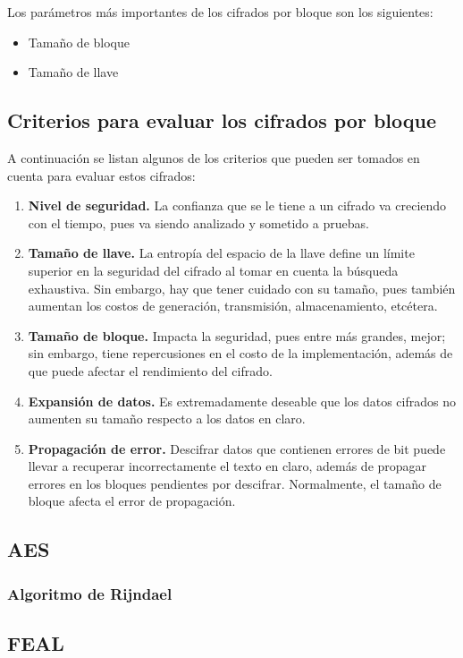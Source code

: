 Los parámetros más importantes de los cifrados por bloque son los 
siguientes:
\begin{itemize}
	\item Tamaño de bloque
	\item Tamaño de llave
\end{itemize}

\subsection{Criterios para evaluar los cifrados por bloque}

A continuación se listan algunos de los criterios que pueden ser tomados en cuenta para evaluar estos cifrados:
\begin{enumerate}
	\item \textbf{Nivel de seguridad.} La confianza que se le tiene a un 
		cifrado va creciendo con el tiempo, pues va siendo analizado y 
		sometido a pruebas.
	\item \textbf{Tamaño de llave.} La entropía del espacio de la llave 
		define un límite superior en la seguridad del cifrado al tomar en 
		cuenta la búsqueda exhaustiva. Sin embargo, hay que tener cuidado 
		con su tamaño, pues también aumentan los costos de generación, 
		transmisión, almacenamiento, etcétera.
	\item \textbf{Tamaño de bloque.} Impacta la seguridad, pues entre más 
		grandes, mejor; sin embargo, tiene repercusiones en el costo de la 
		implementación, además de que puede afectar el rendimiento del 
		cifrado.
	\item \textbf{Expansión de datos.} Es extremadamente deseable que los 
		datos cifrados no aumenten su tamaño respecto a los datos en claro.
	\item \textbf{Propagación de error.} Descifrar datos que contienen 
		errores de bit puede llevar a recuperar incorrectamente el texto en
		claro, además de propagar errores en los bloques pendientes por 
		descifrar. Normalmente, el tamaño de bloque afecta el error de 
		propagación.
\end{enumerate}

%

\subsection{AES}

\subsubsection{Algoritmo de Rijndael}

\subsection{FEAL}




